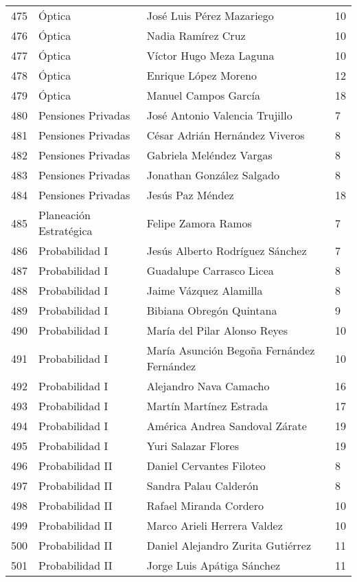\begin{table}[ht]
\begin{tabular}{rlll}
  475 & Óptica & José Luis Pérez Mazariego & 10 \\ 
  476 & Óptica & Nadia Ramírez Cruz & 10 \\ 
  477 & Óptica & Víctor Hugo Meza Laguna & 10 \\ 
  478 & Óptica & Enrique López Moreno & 12 \\ 
  479 & Óptica & Manuel Campos García & 18 \\ 
  480 & Pensiones Privadas & José Antonio Valencia Trujillo & 7 \\ 
  481 & Pensiones Privadas & César Adrián Hernández Viveros & 8 \\ 
  482 & Pensiones Privadas & Gabriela Meléndez Vargas & 8 \\ 
  483 & Pensiones Privadas & Jonathan González Salgado & 8 \\ 
  484 & Pensiones Privadas & Jesús Paz Méndez & 18 \\ 
  485 & Planeación Estratégica & Felipe Zamora Ramos & 7 \\ 
  486 & Probabilidad I & Jesús Alberto Rodríguez Sánchez & 7 \\ 
  487 & Probabilidad I & Guadalupe Carrasco Licea & 8 \\ 
  488 & Probabilidad I & Jaime Vázquez Alamilla & 8 \\ 
  489 & Probabilidad I & Bibiana Obregón Quintana & 9 \\ 
  490 & Probabilidad I & María del Pilar Alonso Reyes & 10 \\ 
  491 & Probabilidad I & María Asunción Begoña Fernández Fernández & 10 \\ 
  492 & Probabilidad I & Alejandro Nava Camacho & 16 \\ 
  493 & Probabilidad I & Martín Martínez Estrada & 17 \\ 
  494 & Probabilidad I & América Andrea Sandoval Zárate & 19 \\ 
  495 & Probabilidad I & Yuri Salazar Flores & 19 \\ 
  496 & Probabilidad II & Daniel Cervantes Filoteo & 8 \\ 
  497 & Probabilidad II & Sandra Palau Calderón & 8 \\ 
  498 & Probabilidad II & Rafael Miranda Cordero & 10 \\ 
  499 & Probabilidad II & Marco Arieli Herrera Valdez & 10 \\ 
  500 & Probabilidad II & Daniel Alejandro Zurita Gutiérrez & 11 \\ 
  501 & Probabilidad II & Jorge Luis Apátiga Sánchez & 11 \\ 

\end{tabular}
\end{table}
